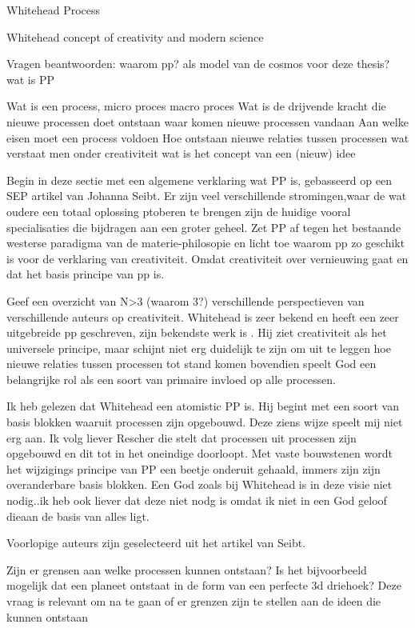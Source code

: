 \documentclass[a4paper]{Thesis}
\begin{document}
Whitehead
Process

Whitehead concept of creativity and modern science




Vragen beantwoorden:
waarom pp? als model van de cosmos voor deze thesis?
wat is PP

Wat is een process, micro proces macro proces
Wat is de drijvende kracht die nieuwe processen doet ontstaan
waar komen nieuwe processen vandaan
Aan welke eisen moet een process voldoen
Hoe ontstaan nieuwe relaties tussen processen
wat verstaat men onder creativiteit
wat is het concept van een (nieuw) idee

Begin in deze sectie met een algemene verklaring wat PP is, gebasseerd op een SEP artikel van Johanna Seibt. Er zijn veel verschillende stromingen,waar de wat oudere een totaal oplossing ptoberen te brengen zijn de huidige vooral specialisaties die bijdragen aan een groter geheel.
Zet PP af tegen het bestaande westerse paradigma van de materie-philosopie en licht toe waarom pp zo geschikt is voor de verklaring van creativiteit. Omdat creativiteit over vernieuwing gaat en dat het basis principe van pp is.

Geef een overzicht van N>3 (waarom 3?) verschillende perspectieven van verschillende auteurs op creativiteit. Whitehead is zeer bekend en heeft een zeer uitgebreide pp geschreven, zijn bekendste werk is \cite{whitehead1929process}. Hij ziet creativiteit als het universele principe, maar schijnt niet erg duidelijk te zijn om uit te leggen hoe nieuwe relaties tussen processen tot stand komen bovendien speelt God een belangrijke rol als een soort van primaire invloed op alle processen.

Ik heb gelezen dat Whitehead een atomistic PP is. Hij begint met een soort van basis blokken waaruit processen zijn opgebouwd. Deze ziens wijze speelt mij niet erg aan. Ik volg liever Rescher die stelt dat processen uit processen zijn opgebouwd en dit tot in het oneindige doorloopt. Met vaste bouwstenen wordt het wijzigings principe van PP een beetje onderuit gehaald, immers zijn zijn overanderbare basis blokken. Een God zoals bij Whitehead is in deze visie niet nodig..ik heb ook liever dat deze niet nodg is omdat ik niet in een God geloof dieaan de basis van alles ligt.

Voorlopige auteurs zijn geselecteerd uit het artikel van Seibt.

Zijn er grensen aan welke processen kunnen ontstaan? Is het bijvoorbeeld mogelijk dat een planeet ontstaat in de form van een perfecte 3d driehoek?
Deze vraag is relevant om na te gaan of er grenzen zijn te stellen aan de ideen die kunnen ontstaan
\end{document}
